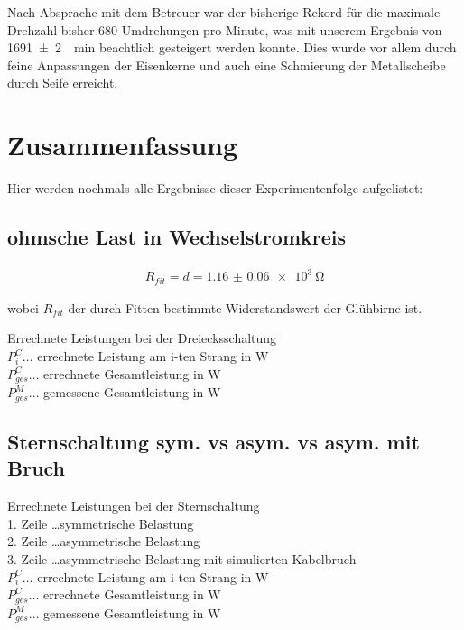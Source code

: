 \documentclass[12pt,english,ngerman]{scrartcl}
\begin{document}
Nach Absprache mit dem Betreuer war der bisherige Rekord für die maximale
Drehzahl bisher 680 Umdrehungen pro Minute, was mit unserem Ergebnis von
\SI{1691(2)}{\per\minute} beachtlich gesteigert werden konnte. Dies wurde vor
allem durch feine Anpassungen der Eisenkerne und auch eine Schmierung der
Metallscheibe durch Seife erreicht.

\section{Zusammenfassung}\label{sec:zusammenfassung}

Hier werden nochmals alle Ergebnisse dieser Experimentenfolge aufgelistet:

\subsection{ohmsche Last in Wechselstromkreis}

\begin{align}
	R_{fit} = d = \SI{1.16(6)e3}{\ohm}
\end{align}

wobei $R_{fit}$ der durch Fitten bestimmte Widerstandswert der Glühbirne ist.

\begin{table}[H]
	\caption[Errechnete Leistungen bei der Dreiecksschaltung]{ Errechnete Leistungen bei der
		Dreiecksschaltung                                      \\
		$P_i^C \dots$ errechnete Leistung am i-ten Strang in W \\
		$P_{ges}^C \dots$ errechnete Gesamtleistung in W       \\
		$P_{ges}^M \dots$ gemessene Gesamtleistung in W
	}
	\centering
	
\end{table}

\subsection{Sternschaltung sym. vs asym. vs asym. mit Bruch}

\begin{table}[H]
	\caption[Errechnete Leistungen bei der Sternschaltung]{Errechnete Leistungen bei der
		Sternschaltung                                                    \\
		1. Zeile \dots symmetrische Belastung                             \\
		2. Zeile \dots asymmetrische Belastung                            \\
		3. Zeile \dots asymmetrische Belastung mit simulierten Kabelbruch \\
		$P_i^C \dots$ errechnete Leistung am i-ten Strang in W            \\
		$P_{ges}^C \dots$ errechnete Gesamtleistung in W                  \\
		$P_{ges}^M \dots$ gemessene Gesamtleistung in W
	}
	\centering
	
\end{table}
\end{document}
